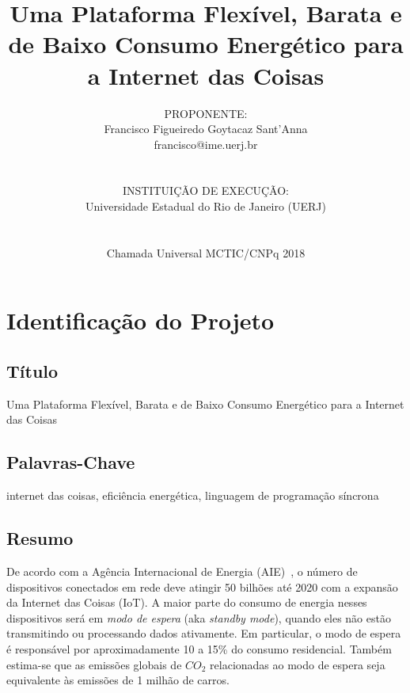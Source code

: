 \documentclass[titlepage,12pt]{article}
\title{ Uma Plataforma Flexível, Barata e de Baixo Consumo Energético para a
        Internet das Coisas }
\author{PROPONENTE:                                     \\
Francisco Figueiredo Goytacaz Sant'Anna                 \\
francisco@ime.uerj.br                                   \\
\\\\
INSTITUIÇÃO DE EXECUÇÃO:                                \\
Universidade Estadual do Rio de Janeiro (UERJ)          \\
\\\\
Chamada Universal MCTIC/CNPq 2018 
}
\begin{document}
 

\maketitle



\section{Identificação do Projeto}

\subsection{Título}

Uma Plataforma Flexível, Barata e de Baixo Consumo Energético para a Internet
das Coisas


\subsection{Palavras-Chave}

internet das coisas, eficiência energética, linguagem de programação síncrona


\subsection{Resumo}

De acordo com a Agência Internacional de Energia (AIE)~\cite{iea.data}, o
número de dispositivos conectados em rede deve atingir 50 bilhões até 2020 com
a expansão da Internet das Coisas (IoT).
A maior parte do consumo de energia nesses dispositivos será em
\emph{modo de espera} (aka \emph{standby mode}), quando eles não estão
transmitindo ou processando dados ativamente.
Em particular, o modo de espera é responsável por aproximadamente 10 a 15\% do
consumo residencial.
Também estima-se que as emissões globais de $CO_2$ relacionadas ao modo de
espera seja equivalente às emissões de 1 milhão de carros.
\end{document}
